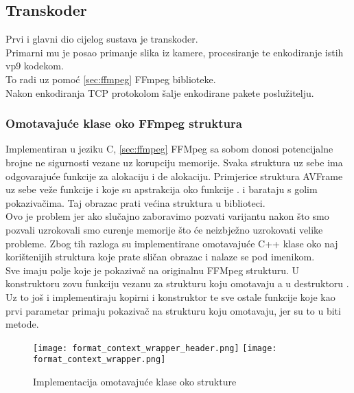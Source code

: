 \subsection{Transkoder}
Prvi i glavni dio cijelog sustava je transkoder.
\\
Primarni mu je posao primanje slika iz kamere, procesiranje te enkodiranje istih vp9 kodekom. 
\\
To radi uz pomoć \ref{sec:ffmpeg} FFmpeg biblioteke. 
\\
Nakon enkodiranja TCP protokolom šalje enkodirane pakete poslužitelju.

\subsubsection{Omotavajuće klase oko FFmpeg struktura} \label{sec:libav_wrappers}
Implementiran u jeziku C, \ref{sec:ffmpeg} FFMpeg sa sobom donosi potencijalne brojne ne sigurnosti vezane uz 
korupciju memorije.
\paraBreak
Svaka struktura uz sebe ima odgovarajuće funkcije za alokaciju i de alokaciju. Primjerice struktura AVFrame 
uz sebe veže funkcije  i  koje su apstrakcija oko funkcije 
. i barataju s golim pokazivačima. Taj obrazac prati većina struktura u biblioteci. \cite{ffmpegDocs} 
\\
Ovo je problem jer ako slučajno zaboravimo pozvati  varijantu nakon što smo pozvali 
uzrokovali smo curenje memorije što će neizbježno uzrokovati velike probleme.
\paraBreak
Zbog tih razloga su implementirane omotavajuće C++ klase oko naj korištenijih struktura koje prate sličan obrazac
i nalaze se pod  imenikom. 
\\
Sve imaju polje  koje je pokazivač na originalnu FFMpeg strukturu.
U konstruktoru zovu  funkciju vezanu za strukturu koju omotavaju a u destruktoru . Uz to još
i implementiraju kopirni i  konstruktor te sve ostale funkcije koje kao prvi parametar primaju pokazivač na
strukturu koju omotavaju, jer su to u biti metode.
\clearpage
\begin{figure}[h]
  \texttt{[image: format\_context\_wrapper\_header.png]}
  \texttt{[image: format\_context\_wrapper.png]}
  \caption[Implementacija omotavajuće klase]{Implementacija omotavajuće klase oko strukture }
\end{figure}
\clearpage

